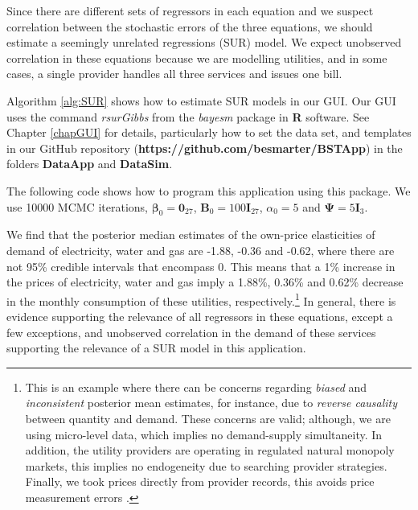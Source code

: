 Since there are different sets of regressors in each equation and we suspect correlation between the stochastic errors of the three equations, we should estimate a seemingly unrelated regressions (SUR) model. We expect unobserved correlation in these equations because we are modelling utilities, and in some cases, a single provider handles all three services and issues one bill.

Algorithm \ref{alg:SUR} shows how to estimate SUR models in our GUI. Our GUI uses the command \textit{rsurGibbs} from the \textit{bayesm} package in \textbf{R} software. See Chapter \ref{chapGUI} for details, particularly how to set the data set, and templates in our GitHub repository (\textbf{https://github.com/besmarter/BSTApp}) in the folders \textbf{DataApp} and \textbf{DataSim}. 

The following code shows how to program this application using this package. We use 10000 MCMC iterations, $\bm{\beta}_0=\bm{0}_{27}$, $\bm{B}_0=100\bm{I}_{27}$, $\alpha_0=5$ and $\bm{\Psi}=5\bm{I}_3$.

We find that the posterior median estimates of the own-price elasticities of demand of electricity, water and gas are -1.88, -0.36 and -0.62, where there are not 95\% credible intervals that encompass 0. This means that a 1\% increase in the prices of electricity, water and gas imply a 1.88\%, 0.36\% and 0.62\% decrease in the monthly consumption of these utilities, respectively.\footnote{This is an example where there can be concerns regarding \textit{biased} and \textit{inconsistent} posterior mean estimates, for instance, due to \textit{reverse causality} between quantity and demand. These concerns are valid; although, we are using micro-level data, which implies no demand-supply simultaneity. In addition, the utility providers are operating in regulated natural monopoly markets, this implies no endogeneity due to searching provider strategies. Finally, we took prices directly from provider records, this avoids price measurement errors \cite{ramirez2024welfare}.} In general, there is evidence supporting the relevance of all regressors in these equations, except a few exceptions, and unobserved correlation in the demand of these services supporting the relevance of a SUR model in this application.   

